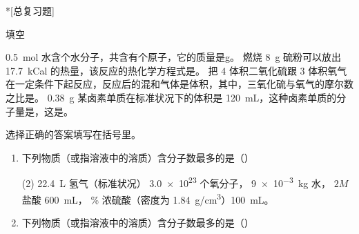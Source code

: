 \begin{Exercise}*[总复习题]
  \begin{question}
    \item 填空
    \begin{tasks}
      \task \qty{0.5}{mol} 水含个水分子，共含有个原子，它的质量是\unit{g}。
      \task 燃烧 \qty{8}{g} 硫粉可以放出 \qty{17.7}{kCal} 的热量，该反应的热化学方程式是。
      \task 把 4 体积二氧化硫跟 3 体积氧气在一定条件下起反应，反应后的混和气体是体积，其中，三氧化硫与氧气的摩尔数之比是。
      \task \qty{0.38}{g} 某卤素单质在标准状况下的体积是 \qty{120}{mL}，这种卤素单质的分子量是，这是。
      \task
    \end{tasks}
    \item 选择正确的答案填写在括号里。
    \begin{enumerate}[label=(\arabic*),leftmargin=1.7em]
      \item 下列物质（或指溶液中的溶质）含分子数最多的是\hfill（\qquad ）
      \begin{tasks}(2)
        \task \qty{22.4}{L} 氢气（标准状况）
        \task \num{3.0e23} 个氧分子，
        \task \qty{9e-3}{kg} 水，
        \task $2M$ 盐酸 \qty{600}{mL}，
        \% 浓硫酸（密度为 \qty{1.84}{g/cm^3}）\qty{100}{mL}。
      \end{tasks}
      \item 下列物质（或指溶液中的溶质）含分子数最多的是\hfill（\qquad ）
    \end{enumerate}
    \item 
    \item 
    \item 
    \item 
    \item 
    \item 
    \item 
    \item 
    \item 
    \item 
    \item 
    \item 
    \item 
    \item 
    \item 
    \item 
    \item 
    \item 
  \end{question}
\end{Exercise}